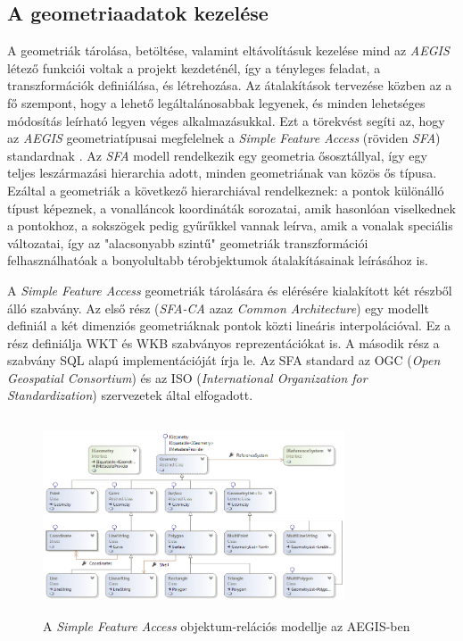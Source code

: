 \subsection{A geometriaadatok kezelése}
A geometriák tárolása, betöltése, valamint eltávolításuk kezelése mind az \emph{AEGIS} létező funkciói voltak a projekt kezdeténél, így a tényleges feladat, a transzformációk definiálása, és létrehozása.
Az átalakítások tervezése közben az a fő szempont, hogy a lehető legáltalánosabbak legyenek, és minden lehetséges módosítás leírható legyen véges alkalmazásukkal. Ezt a törekvést segíti az, hogy az \emph{AEGIS} geometriatípusai megfelelnek a \emph{Simple Feature Access} (röviden \emph{SFA}) standardnak \cite{sfa}. Az \emph{SFA} modell rendelkezik egy geometria ősosztállyal, így egy teljes leszármazási hierarchia adott, minden geometriának van közös ős típusa. Ezáltal a geometriák a következő hierarchiával rendelkeznek: a pontok különálló típust képeznek, a vonalláncok koordináták sorozatai, amik hasonlóan viselkednek a pontokhoz, a sokszögek pedig gyűrűkkel vannak leírva, amik a vonalak speciális változatai, így az "alacsonyabb szintű" geometriák transzformációi felhasználhatóak a bonyolultabb térobjektumok átalakításainak leírásához is. 
\begin{note}
A \emph{Simple Feature Access} geometriák tárolására és elérésére kialakított két részből álló szabvány. Az első rész (\emph{SFA-CA} azaz \emph{Common Architecture}) egy modellt definiál a két dimenziós geometriáknak pontok közti lineáris interpolációval. Ez a rész definiálja WKT és WKB szabványos reprezentációkat is. A második rész a szabvány SQL alapú implementációját írja le. Az SFA standard az OGC (\emph{Open Geospatial Consortium}) és az ISO (\emph{International Organization for Standardization}) szervezetek által elfogadott.
\begin{figure}[H]
	\centering
	\includegraphics[width=0.8\textwidth,height=220px]{images/sfa.png}
	\caption{A \emph{Simple Feature Access} objektum-relációs modellje az AEGIS-ben}
	\label{fig:picture-8}
\end{figure}
\end{note}

